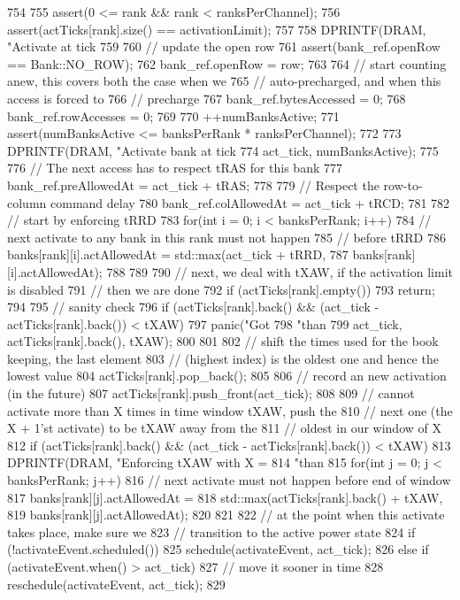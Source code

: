 \begin{DoxyCode}
754 {
755     assert(0 <= rank && rank < ranksPerChannel);
756     assert(actTicks[rank].size() == activationLimit);
757 
758     DPRINTF(DRAM, "Activate at tick %
759 
760     // update the open row
761     assert(bank_ref.openRow == Bank::NO_ROW);
762     bank_ref.openRow = row;
763 
764     // start counting anew, this covers both the case when we
765     // auto-precharged, and when this access is forced to
766     // precharge
767     bank_ref.bytesAccessed = 0;
768     bank_ref.rowAccesses = 0;
769 
770     ++numBanksActive;
771     assert(numBanksActive <= banksPerRank * ranksPerChannel);
772 
773     DPRINTF(DRAM, "Activate bank at tick %
774             act_tick, numBanksActive);
775 
776     // The next access has to respect tRAS for this bank
777     bank_ref.preAllowedAt = act_tick + tRAS;
778 
779     // Respect the row-to-column command delay
780     bank_ref.colAllowedAt = act_tick + tRCD;
781 
782     // start by enforcing tRRD
783     for(int i = 0; i < banksPerRank; i++) {
784         // next activate to any bank in this rank must not happen
785         // before tRRD
786         banks[rank][i].actAllowedAt = std::max(act_tick + tRRD,
787                                                banks[rank][i].actAllowedAt);
788     }
789 
790     // next, we deal with tXAW, if the activation limit is disabled
791     // then we are done
792     if (actTicks[rank].empty())
793         return;
794 
795     // sanity check
796     if (actTicks[rank].back() && (act_tick - actTicks[rank].back()) < tXAW) {
797         panic("Got %
798               "than %
799               act_tick, actTicks[rank].back(), tXAW);
800     }
801 
802     // shift the times used for the book keeping, the last element
803     // (highest index) is the oldest one and hence the lowest value
804     actTicks[rank].pop_back();
805 
806     // record an new activation (in the future)
807     actTicks[rank].push_front(act_tick);
808 
809     // cannot activate more than X times in time window tXAW, push the
810     // next one (the X + 1'st activate) to be tXAW away from the
811     // oldest in our window of X
812     if (actTicks[rank].back() && (act_tick - actTicks[rank].back()) < tXAW) {
813         DPRINTF(DRAM, "Enforcing tXAW with X = %
814                 "than %
815             for(int j = 0; j < banksPerRank; j++)
816                 // next activate must not happen before end of window
817                 banks[rank][j].actAllowedAt =
818                     std::max(actTicks[rank].back() + tXAW,
819                              banks[rank][j].actAllowedAt);
820     }
821 
822     // at the point when this activate takes place, make sure we
823     // transition to the active power state
824     if (!activateEvent.scheduled())
825         schedule(activateEvent, act_tick);
826     else if (activateEvent.when() > act_tick)
827         // move it sooner in time
828         reschedule(activateEvent, act_tick);
829 }
\end{DoxyCode}
